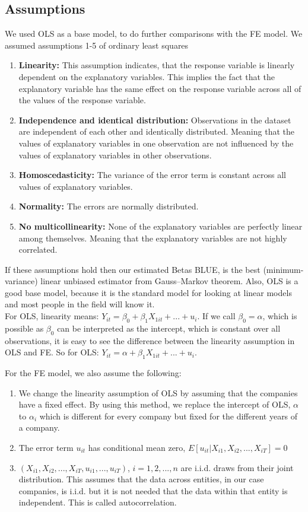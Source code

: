 \documentclass[11pt, letterpaper]{article}
\begin{document}
\subsection{Assumptions}
We used OLS as a base model, to do further comparisons with the FE model.
We assumed assumptions 1-5 of  ordinary least squares
\begin{enumerate}
    \item \textbf{Linearity:} This assumption indicates, that the response variable is linearly dependent on the explanatory variables. This implies the fact that the explanatory variable has the same effect on the response variable across all of the values of the response variable.
    \item \textbf{Independence and identical distribution:} Observations in the dataset are independent of each other and identically distributed. Meaning that the values of explanatory variables in one observation are not influenced by the values of explanatory variables in other observations.
    \item \textbf{Homoscedasticity:} The variance of the error term is constant across all values of explanatory variables.
    \item \textbf{Normality:} The errors are normally distributed. 
    \item \textbf{No multicollinearity:} None of the explanatory variables are perfectly linear among themselves. Meaning that the explanatory variables are not highly correlated.
\end{enumerate}
If these assumptions hold then our estimated Betas BLUE, is the best (minimum-variance) linear unbiased estimator from Gauss–Markov theorem. Also, OLS is a good base model, because it is the standard model for looking at linear models and most people in the field will know it.\\

For OLS, linearity means: $Y_{it}=\beta_0 +\beta_1X_{1it}+...+ u_i$. If we call $\beta_0 =\alpha$, which is possible as $\beta_0$ can be interpreted as the intercept, which is constant over all observations, it is easy to see the difference between the linearity assumption in OLS and FE. So for OLS:  $Y_{it}=\alpha +\beta_1X_{1it}+...+ u_i$. 

For the FE model, we also assume the following:
\begin{enumerate}
    \item We change the linearity assumption of OLS by assuming that the companies have a fixed effect. By using this method, we replace the intercept of OLS, $\alpha$ to $\alpha_i$ which is different for every company but fixed for the different years of a company.
    \item The error term $u_{it}$ has conditional mean zero, $E[u_{it}|X_{i1}, X_{i2}, ..., X_{iT}]=0$
    \item $(X_{i1}, X_{i2}, ..., X_{iT}, u_{i1}, ..., u_{iT})$, $i=1, 2, ..., n$ are i.i.d. draws from their joint distribution. This assumes that the data across entities, in our case companies, is i.i.d. but it is not needed that the data within that entity is independent. This is called autocorrelation.
\end{enumerate}
\end{document}
